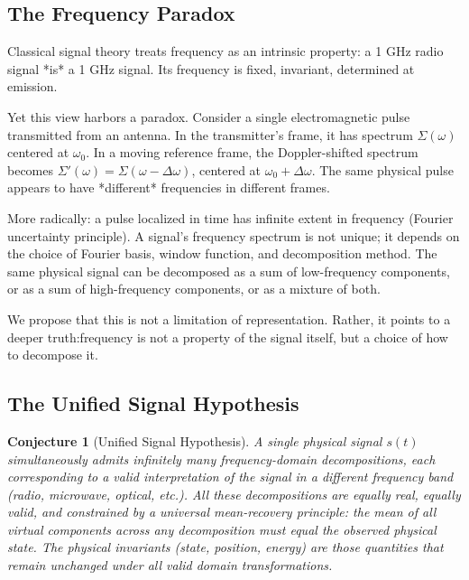 \documentclass[twocolumn,11pt,a4paper]{article}
\newtheorem{conjecture}{Conjecture}
\newcommand{\signal}{s}
\newcommand{\spectrum}{\Sigma}
\newcommand{\freq}{\omega}
\begin{document}
\subsection{The Frequency Paradox}

Classical signal theory treats frequency as an intrinsic property: a 1 GHz radio signal *is* a 1 GHz signal. Its frequency is fixed, invariant, determined at emission.

Yet this view harbors a paradox. Consider a single electromagnetic pulse transmitted from an antenna. In the transmitter's frame, it has spectrum $\spectrum(\freq)$ centered at $\freq_0$. In a moving reference frame, the Doppler-shifted spectrum becomes $\spectrum'(\freq) = \spectrum(\freq - \Delta\freq)$, centered at $\freq_0 + \Delta\freq$. The same physical pulse appears to have *different* frequencies in different frames.

More radically: a pulse localized in time has infinite extent in frequency (Fourier uncertainty principle). A signal's frequency spectrum is not unique; it depends on the choice of Fourier basis, window function, and decomposition method. The same physical signal can be decomposed as a sum of low-frequency components, or as a sum of high-frequency components, or as a mixture of both.

We propose that this is not a limitation of representation. Rather, it points to a deeper truth:frequency is not a property of the signal itself, but a choice of how to decompose it.

\subsection{The Unified Signal Hypothesis}

\begin{conjecture}[Unified Signal Hypothesis]
\label{conj:unified}
A single physical signal $\signal(t)$ simultaneously admits infinitely many frequency-domain decompositions, each corresponding to a valid interpretation of the signal in a different frequency band (radio, microwave, optical, etc.). All these decompositions are equally real, equally valid, and constrained by a universal mean-recovery principle: the mean of all virtual components across any decomposition must equal the observed physical state. The physical invariants (state, position, energy) are those quantities that remain unchanged under all valid domain transformations.
\end{conjecture}
\end{document}
